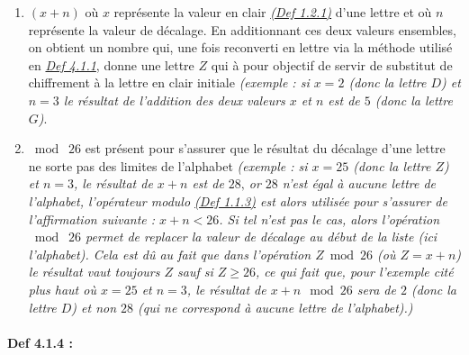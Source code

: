 \documentclass[
  paper=a4,
  ,captions=tableheading
]{scrartcl}
\begin{document}
\begin{enumerate}
\def\labelenumi{\arabic{enumi}.}
\item
  \((x+n)\) où \(x\) représente la valeur en clair
  \emph{\href{Introduction\%20au\%20Chiffrement\%20-\%20Théories\%20et\%20Pratiques\%20du\%20Chiffrement\%20Symétrique\%20et\%20Asymétrique\%20avec\%20une\%20Étude\%20de\%20Cas\%20sur\%20l'Algorithme\%20RSA.\#Def\%201.2.1}{(Def
  1.2.1)}} d'une lettre et où \(n\) représente la valeur de décalage. En
  additionnant ces deux valeurs ensembles, on obtient un nombre qui, une
  fois reconverti en lettre via la méthode utilisé en
  \emph{\href{Introduction\%20au\%20Chiffrement\%20-\%20Théories\%20et\%20Pratiques\%20du\%20Chiffrement\%20Symétrique\%20et\%20Asymétrique\%20avec\%20une\%20Étude\%20de\%20Cas\%20sur\%20l'Algorithme\%20RSA.\#Def\%204.1.1}{Def
  4.1.1}}, donne une lettre \(Z\) qui à pour objectif de servir de
  substitut de chiffrement à la lettre en clair initiale \emph{(exemple
  : si \(x = 2\) (donc la lettre \(D\)) et \(n=3\) le résultat de
  l'addition des deux valeurs \(x\) et \(n\) est de \(5\) (donc la
  lettre \(G\))}.
\item
  \(\bmod \;26\) est présent pour s'assurer que le résultat du décalage
  d'une lettre ne sorte pas des limites de l'alphabet \emph{(exemple :
  si \(x=25\) (donc la lettre \(Z\)) et \(n=3\), le résultat de \(x+n\)
  est de \(28\text{,}\) or \(28\) n'est égal à aucune lettre de
  l'alphabet, l'opérateur modulo
  \href{Introduction\%20au\%20Chiffrement\%20-\%20Théories\%20et\%20Pratiques\%20du\%20Chiffrement\%20Symétrique\%20et\%20Asymétrique\%20avec\%20une\%20Étude\%20de\%20Cas\%20sur\%20l'Algorithme\%20RSA.\#Def\%201.1.3}{(Def
  1.1.3)} est alors utilisée pour s'assurer de l'affirmation suivante :
  \(x+n < 26\). Si tel n'est pas le cas, alors l'opération
  \(\bmod \; 26\) permet de replacer la valeur de décalage au début de
  la liste (ici l'alphabet). Cela est dû au fait que dans l'opération
  \(Z \bmod 26\) (où \(Z=x+n\)) le résultat vaut toujours \(Z\) sauf si
  \(Z\geq26\), ce qui fait que, pour l'exemple cité plus haut où
  \(x=25\) et \(n=3\), le résultat de \(x+n \mod 26\) sera de \(2\)
  (donc la lettre \(D\)) et non \(28\) (qui ne correspond à aucune
  lettre de l'alphabet).)}
\end{enumerate}

\paragraph{Def 4.1.4 :}\label{def-4.1.4}
\end{document}
